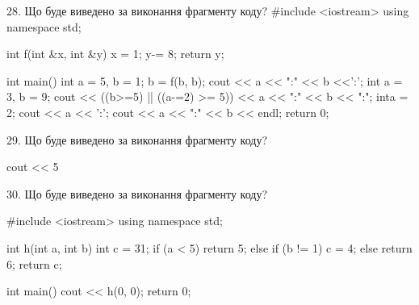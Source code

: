 \documentclass[11pt, ukrainian]{article}
\begin{document}
\begin{large}

28. Що буде виведено за виконання фрагменту коду?
#include <iostream>
using namespace std;

int f(int &x, int &y){
    x = 1;
    y-= 8;
    return y;
}

int main(){
    int a = 5, b = 1;
    b = f(b, b);
    cout << a << ":" << b <<':';
    {
        int a = 3, b = 9;
        cout << ((b>=5) || ((a-=2) >= 5))
             << a << ":" << b << ":";
    }
    {
        inta = 2;
        cout << a << ':';
    }
    cout << a << ":" << b << endl;
    return 0;
}



29. Що буде виведено за виконання фрагменту коду?

cout << 5 %


30. Що буде виведено за виконання фрагменту коду?

#include <iostream>
using namespace std;

int h(int a, int b){
    int c = 31;
    if (a < 5)
        return 5;
    else if (b != 1)
         c = 4;
    else 
        return 6;
    return c;
}

int main(){
    cout << h(0, 0);
    return 0;
}

\end{large}
\newpage
\end{document}
